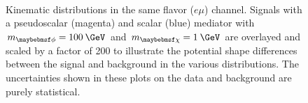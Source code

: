 \begin{figure}[h!]
  \ContinuedFloat
  \centering
   \\ 
  \caption{Kinematic distributions in the same flavor ($e\mu$) channel. Signals with a pseudoscalar (magenta) and scalar (blue) mediator with $\mMed=100\:\GeV$ and $\mDM=1\:\GeV$ are overlayed and scaled by a factor of 200 to illustrate the potential shape differences between the signal and background in the various distributions. The uncertainties shown in these plots on the data and background are purely statistical.}
  \label{fig:dilep_sr_em}
\end{figure}

